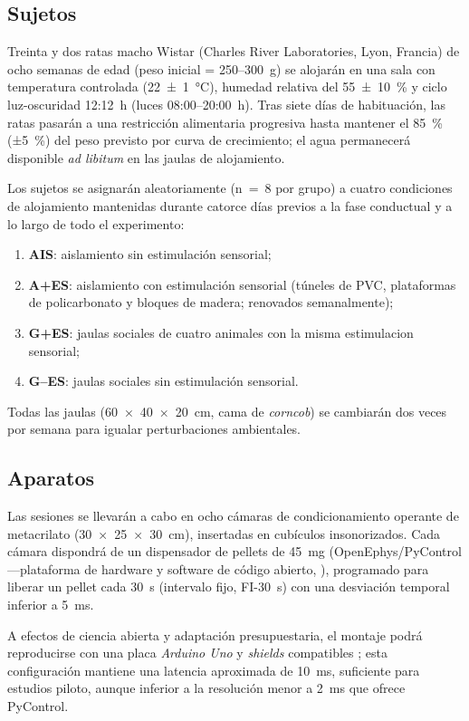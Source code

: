 \documentclass[12pt,a4paper]{article}
\begin{document}
\begin{multicols}{2}
\subsection*{Sujetos}

Treinta y dos ratas macho Wistar (Charles River Laboratories, Lyon, Francia) de ocho semanas de edad (peso inicial = 250–300~g) se alojarán en una sala con temperatura controlada (22~±~1~°C), humedad relativa del 55~±~10~\% y ciclo luz-oscuridad 12:12~h (luces 08:00–20:00~h). Tras siete días de habituación, las ratas pasarán a una restricción alimentaria progresiva hasta mantener el 85~\% (±5~\%) del peso previsto por curva de crecimiento; el agua permanecerá disponible \textit{ad libitum} en las jaulas de alojamiento.

Los sujetos se asignarán aleatoriamente (n~=~8 por grupo) a cuatro condiciones de alojamiento mantenidas durante catorce días previos a la fase conductual y a lo largo de todo el experimento: 
\begin{enumerate}
    \item \textbf{AIS}: aislamiento sin estimulación sensorial;
    \item \textbf{A+ES}: aislamiento con estimulación sensorial (túneles de PVC, plataformas de policarbonato y bloques de madera; renovados semanalmente);
    \item \textbf{G+ES}: jaulas sociales de cuatro animales con la misma estimulacion sensorial;
    \item \textbf{G--ES}: jaulas sociales sin estimulación sensorial.
\end{enumerate}
Todas las jaulas (60~×~40~×~20~cm, cama de \textit{corncob}) se cambiarán dos veces por semana para igualar perturbaciones ambientales.

\subsection*{Aparatos}

Las sesiones se llevarán a cabo en ocho cámaras de condicionamiento operante de metacrilato (30~×~25~×~30~cm), insertadas en cubículos insonorizados. Cada cámara dispondrá de un dispensador de pellets de 45~mg (OpenEphys/PyControl —plataforma de hardware y software de código abierto, \citep{PelletDispenserGitHub}), programado para liberar un pellet cada 30~s (intervalo fijo, FI-30~s) con una desviación temporal inferior a 5~ms.

A efectos de ciencia abierta y adaptación presupuestaria, el montaje podrá reproducirse con una placa \textit{Arduino Uno} y \textit{shields} compatibles \citep{Arduino2024}; esta configuración mantiene una latencia aproximada de 10~ms, suficiente para estudios piloto, aunque inferior a la resolución menor a 2~ms que ofrece PyControl.


\end{multicols}
\end{document}

